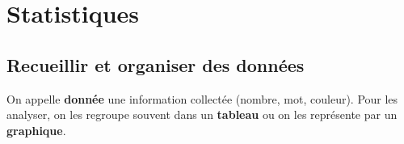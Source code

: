 \documentclass[a4paper]{book}
\begin{document}
\setcounter{chapter}{11}
\renewcommand{\monTitre}{Statistiques}
\chapter{\monTitre}
\thispagestyle{fancy}

\section{Recueillir et organiser des données}
    
    \begin{definition}
        On appelle \textbf{donnée} une information collectée (nombre, mot, couleur). Pour les analyser, on les regroupe souvent dans un \textbf{tableau} ou on les représente par un \textbf{graphique}. 
    \end{definition}
    
\end{document}
